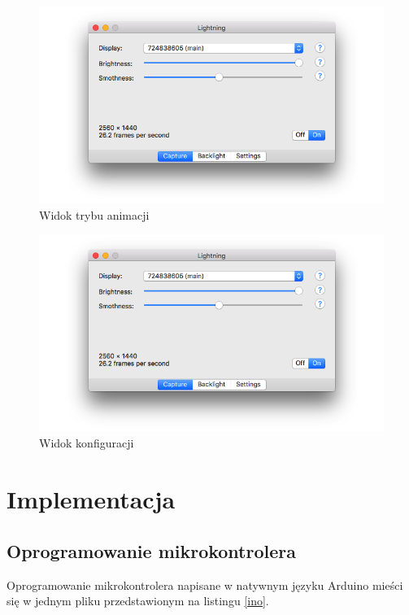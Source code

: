 \documentclass[12pt]{report}
\begin{document}
\begin{figure}[h!]
\centering
\includegraphics[width=\textwidth]{../resources/capture.png}
\caption{Widok trybu animacji}
\end{figure}

\begin{figure}[h!]
\centering
\includegraphics[width=\textwidth]{../resources/capture.png}
\caption{Widok konfiguracji}
\end{figure}

\vfill
\clearpage


\section{Implementacja}

\subsection{Oprogramowanie mikrokontrolera}

Oprogramowanie mikrokontrolera napisane w natywnym języku Arduino mieści się w jednym pliku przedstawionym na listingu \ref{ino}.
\end{document}
